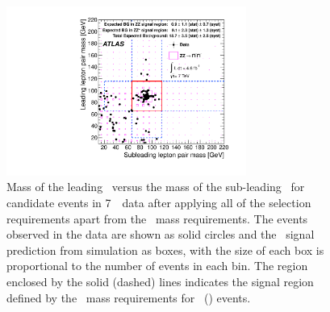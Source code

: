 
 \begin{figure}[htbp]
 \begin{center}
  \includegraphics[width=0.7\textwidth]{7TeV/h_mz1_mz2.pdf}\hfill
  \caption[Mass of the leading \leppair\ versus the mass of the
  sub-leading \leppair\ for candidate events in 7~\tev\ data, after applying all of the selection
  requirements apart from the \dilepton\ mass requirements .]
  {\small Mass of the leading \leppair\ versus the mass of the
  sub-leading \leppair\ for candidate events in 7~\tev\ data after
  applying all of the selection
  requirements apart from the \dilepton\ mass requirements.
  The events observed in the data are shown as solid circles and the \ZZsllll\
  signal prediction from simulation as boxes,
  with the size of each box is proportional to the number of events in each bin.  
  The region enclosed by the solid (dashed) lines indicates the signal region defined by the
  \dilepton\ mass requirements for \ZZ\ (\ZZs) events.
   }
    \label{fig:zzdists-Zmass2D-seven}
 \end{center}
 \end{figure}

